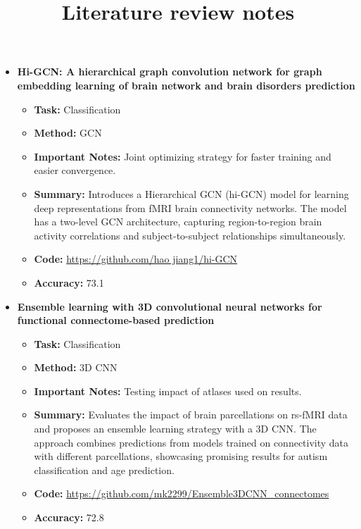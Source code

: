 \documentclass{article}
\title{Literature review notes}
\begin{document}
\maketitle

\begin{itemize}[left=0pt]
  \item \textbf{Hi-GCN: A hierarchical graph convolution network for graph embedding learning of brain network and brain disorders prediction}
  \begin{itemize}
    \item \textbf{Task:} Classification
    \item \textbf{Method:} GCN
    \item \textbf{Important Notes:} Joint optimizing strategy for faster training and easier convergence.
    \item \textbf{Summary:} Introduces a Hierarchical GCN (hi-GCN) model for learning deep representations from fMRI brain connectivity networks. The model has a two-level GCN architecture, capturing region-to-region brain activity correlations and subject-to-subject relationships simultaneously.
    \item \textbf{Code:} \url{https://github.com/hao jiang1/hi-GCN}
    \item \textbf{Accuracy:} 73.1
  \end{itemize}

  \item \textbf{Ensemble learning with 3D convolutional neural networks for functional connectome-based prediction}
  \begin{itemize}
    \item \textbf{Task:} Classification
    \item \textbf{Method:} 3D CNN
    \item \textbf{Important Notes:} Testing impact of atlases used on results.
    \item \textbf{Summary:} Evaluates the impact of brain parcellations on rs-fMRI data and proposes an ensemble learning strategy with a 3D CNN. The approach combines predictions from models trained on connectivity data with different parcellations, showcasing promising results for autism classification and age prediction.
    \item \textbf{Code:} \url{https://github.com/mk2299/Ensemble3DCNN_connectomes}
    \item \textbf{Accuracy:} 72.8
  \end{itemize}


\end{itemize}
\end{document}
